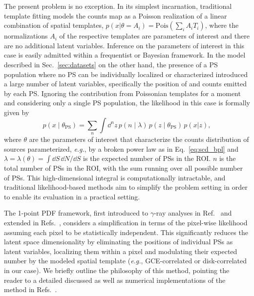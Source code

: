 \documentclass[prd,aps,10pt,nofootinbib,twocolumn,superscriptaddress,preprintnumbers,balancelastpage,longbibliography]{revtex4-1}
\begin{document}
The present problem is no exception. In its simplest incarnation, traditional template fitting models the counts map as a Poisson realization of a linear combination of spatial templates, $p(x|\theta = A_i) = \mathrm{Pois}\left(\sum_i A_i T_i\right)$, where the normalizations $A_i$ of the respective templates are parameters of interest and there are no additional latent variables. Inference on the parameters of interest in this case is easily admitted within a frequentist or Bayesian framework. In the model described in Sec.~\ref{sec:datasets} on the other hand, the presence of a PS population where no PS can be individually localized or characterized introduced a large number of latent variables, specifically the position of and counts emitted by each PS. Ignoring the contribution from Poissonian templates for a moment and considering only a single PS population, the likelihood in this case is formally given by
\begin{equation}
\label{eq:data_likelihood}
p(x\mid\theta_\mathrm{PS}) = \sum_{n} \int \dd^{n} z \, p\left(n\mid\lambda\right)\,p(z\mid\theta_\mathrm{PS})\,p(x|z),
\end{equation}
where $\theta$ are the parameters of interest that characterize the counts distribution of sources parameterized, \emph{e.g.}, by a broken power law as in Eq.~\eqref{eq:scd_bpl} and $\lambda = \lambda(\theta) = \int \dd S\, \dd N/\dd S$ is the expected number of PSs in the ROI. $n$ is the total number of PSs in the ROI, with the sum running over all possible number of PSs. This high-dimensional integral is computationally intractable, and traditional likelihood-based methods aim to simplify the problem setting in order to enable its evaluation in a practical setting.

The 1-point PDF framework, first introduced to $\gamma$-ray analyses in Ref.~\cite{Malyshev:2011zi} and extended in Refs.~\cite{Lee:2014mza,Lee:2015fea}, considers a simplification in terms of the pixel-wise likelihood assuming each pixel to be statistically independent. This significantly reduces the latent space dimensionality by eliminating the positions of individual PSs as latent variables, localizing them within a pixel and modulating their expected number by the modeled spatial template (\emph{e.g.}, GCE-correlated or disk-correlated in our case). We briefly outline the philosophy of this method, pointing the reader to a detailed discussed as well as numerical implementations of the method in Refs.~\cite{Lee:2015fea,Mishra-Sharma:2016gis}.
\end{document}
